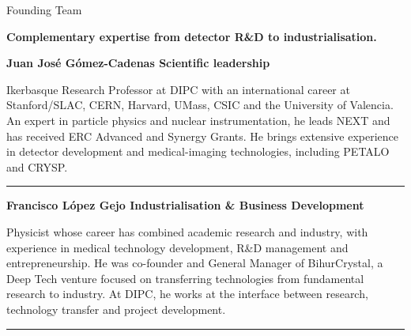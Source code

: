 \documentclass[aspectratio=169,11pt]{beamer}
\begin{document}
\begin{frame}{Founding Team}
\linespread{0.70}\selectfont  

\vspace{-0.05cm}

\begin{center}
{\scriptsize\bfseries
Complementary expertise from detector R\&D to industrialisation.
}
\end{center}

\vspace{0.10cm}


{\scriptsize\bfseries\color{PTblue}
Juan José Gómez-Cadenas
\hfill
{\tiny\bfseries\color{black}
Scientific leadership}
}

\vspace{0.03cm}

{\tiny 
Ikerbasque Research Professor at DIPC with an international career at
Stanford/SLAC, CERN, Harvard, UMass, CSIC and the University of Valencia.
An expert in particle physics and nuclear instrumentation, he leads NEXT
and has received ERC Advanced and Synergy Grants. He brings extensive
experience in detector development and medical-imaging technologies,
including PETALO and CRYSP.
}

{\color{gray!35}\rule{\textwidth}{0.35pt}}


{\scriptsize\bfseries\color{PTblue}
Francisco López Gejo
\hfill
{\tiny\bfseries\color{black}
Industrialisation \& Business Development}
}

\vspace{0.03cm}

{\tiny
Physicist whose career has combined academic research and industry,
with experience in medical technology development, R\&D management and
entrepreneurship. He was co-founder and General Manager of BihurCrystal,
a Deep Tech venture focused on transferring technologies from fundamental
research to industry. At DIPC, he works at the interface between research,
technology transfer and project development.
}

{\color{gray!35}\rule{\textwidth}{0.35pt}}



\end{frame}
\end{document}
